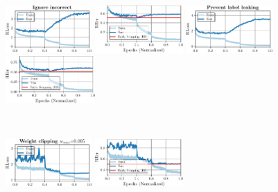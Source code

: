 \begin{figure}[t]
\begin{minipage}[t]{0.19\textwidth}
		\includegraphics[height=1.8cm]{plots_supp_training_curves_ii_loss}
		
		\hspace*{-0.25cm}
		\includegraphics[height=1.8cm]{plots_supp_training_curves_ii_error}
	\end{minipage}
	\begin{minipage}[t]{0.19\textwidth}
		\vspace*{0px}
		
		\includegraphics[height=1.8cm]{plots_supp_training_curves_pll_loss}
		
		\hspace*{-0.25cm}
		\includegraphics[height=1.8cm]{plots_supp_training_curves_pll_error}
	\end{minipage}
	\\[2.5px]
	
	\begin{minipage}[t]{0.19\textwidth}
		\vspace*{0px}
		
		\includegraphics[height=1.8cm]{plots_supp_training_curves_0005p_loss}
		
		\hspace*{-0.25cm}
		\includegraphics[height=1.8cm]{plots_supp_training_curves_0005p_error}
	\end{minipage}
	\begin{minipage}[t]{0.19\textwidth}
		\vspace*{0px}
		

\end{minipage}
\end{figure}
